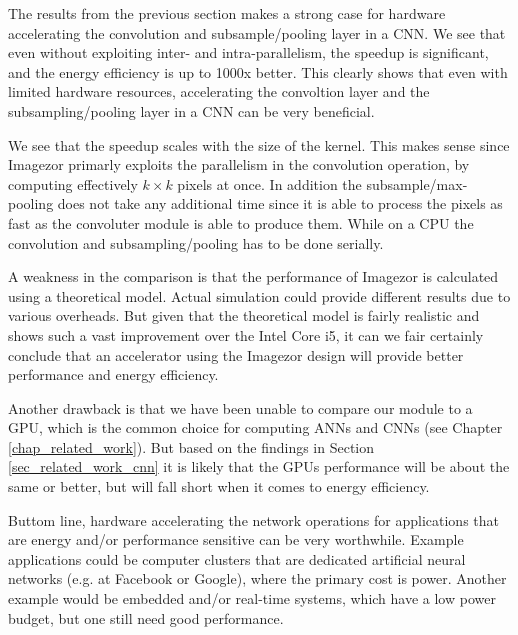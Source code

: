 The results from the previous section makes a strong case for hardware accelerating the convolution and subsample/pooling layer in a CNN. We see that even without exploiting inter- and intra-parallelism, the speedup is significant, and the energy efficiency is up to 1000x better. This clearly shows that even with limited hardware resources, accelerating the convoltion layer and the subsampling/pooling layer in a CNN can be very beneficial. 

We see that the speedup scales with the size of the kernel. This makes sense since Imagezor primarly exploits the parallelism in the convolution operation, by computing effectively $ k \times k $ pixels at once. In addition the subsample/max-pooling does not take any additional time since it is able to process the pixels as fast as the convoluter module is able to produce them. While on a CPU the convolution and subsampling/pooling has to be done serially.  

A weakness in the comparison is that the performance of Imagezor is calculated using a theoretical model. Actual simulation could provide different results due to various overheads. But given that the theoretical model is fairly realistic and shows such a vast improvement over the Intel Core i5, it can we fair certainly conclude that an accelerator using the Imagezor design will provide better performance and energy efficiency. 

Another drawback is that we have been unable to compare our module to a GPU, which is the common choice for computing ANNs and CNNs (see Chapter \ref{chap_related_work}). But based on the findings in Section \ref{sec_related_work_cnn} it is likely that the GPUs performance will be about the same or better, but will fall short when it comes to energy efficiency. 

Buttom line, hardware accelerating the network operations for applications that are energy and/or performance sensitive can be very worthwhile. Example applications could be computer clusters that are dedicated artificial neural networks (e.g. at Facebook or Google), where the primary cost is power. Another example would be embedded and/or real-time systems, which have a low power budget, but one still need good performance. 


